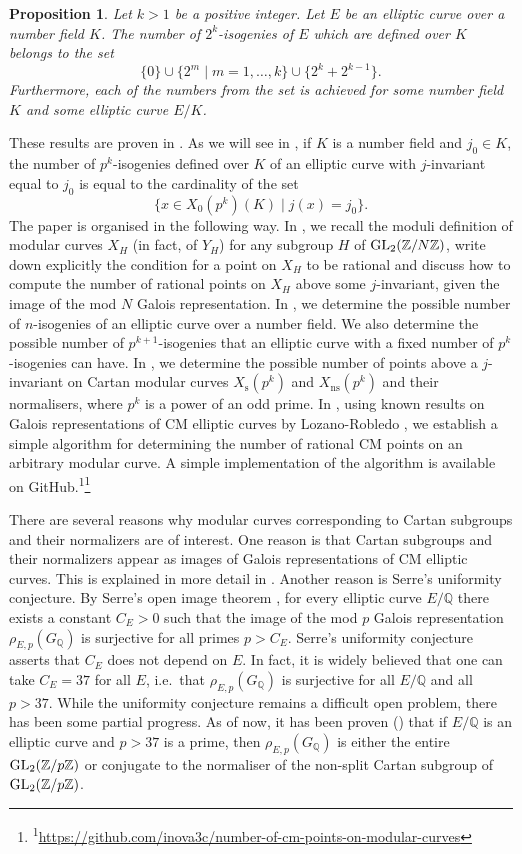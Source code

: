 \documentclass[10pt,leqno]{amsart}
\newcommand{\Z}{\mathbb{Z}}
\newcommand{\Q}{\mathbb{Q}}
\newcommand{\GL}{\textnormal{GL}}
\newtheorem{proposition}[theorem]{Proposition}
\theoremstyle{definition}
\theoremstyle{remark}
\numberwithin{theorem}{section}
\begin{document}
\begin{proposition}
     Let $k>1$ be a positive integer. Let $E$ be an elliptic curve over a number field $K$. The number of $2^k$-isogenies of $E$ which are defined over $K$ belongs to the set $$\{0\} \cup \{2^m \mid m=1,\ldots, k\}\cup \{2^k+2^{k-1}\}.$$ Furthermore, each of the numbers from the set is achieved for some number field $K$ and some elliptic curve $E/K$.  
\end{proposition}
These results are proven in . As we will see in , if $K$ is a number field and $j_0\in K$, the number of $p^k$-isogenies defined over $K$ of an elliptic curve with $j$-invariant equal to $j_0$ is equal to the cardinality of the set $$\{ x \in X_0(p^k)(K) \mid j(x)=j_0\}.$$ 
The paper is organised in the following way. In , we recall the moduli definition of modular curves $X_H$ (in fact, of $Y_H$) for any subgroup $H$ of $\GL_2(\Z/N\Z)$, write down explicitly the condition for a point on $X_H$ to be rational and discuss how to compute the number of rational points on $X_H$ above some $j$-invariant, given the image of the mod $N$ Galois representation. In , we determine the possible number of $n$-isogenies of an elliptic curve over a number field. We also determine the possible number of $p^{k+1}$-isogenies that an elliptic curve with a fixed number of $p^k$-isogenies can have. In , we determine the possible number of points above a $j$-invariant on Cartan modular curves $X_{\mathrm{s}}(p^k)$ and $X_{\mathrm{ns}}(p^k)$ and their normalisers, where $p^k$ is a power of an odd prime. In , using known results on Galois representations of CM elliptic curves by Lozano-Robledo \cite{alvarocm}, we establish a simple algorithm for determining the number of rational CM points on an arbitrary modular curve.  A simple implementation of the algorithm is available on GitHub\cite{novak:cm-modular-curves-github}.\textsuperscript{1}\footnote{\textsuperscript{1}\url{https://github.com/inova3c/number-of-cm-points-on-modular-curves}}

There are several reasons why modular curves corresponding to Cartan subgroups and their normalizers are of interest. One reason is that Cartan subgroups and their normalizers appear as images of Galois representations of CM elliptic curves. This is explained in more detail in . Another reason is Serre's uniformity conjecture. By Serre's open image theorem \cite{openimage}, for every elliptic curve $E/\Q$ there exists a constant $C_E>0$ such that the image of the mod $p$ Galois representation $\rho_{E,p}(G_\Q)$ is surjective for all primes $p>C_E$. Serre's uniformity conjecture asserts that $C_E$ does not depend on $E$.  In fact, it is widely believed that one can take $C_E=37$ for all $E$, i.e.\ that $\rho_{E,p}(G_\Q)$ is surjective for all $E/\Q$ and all $p>37$. While the uniformity conjecture remains a difficult open problem, there has been some partial progress. As of now, it has been proven (\cite{serrecheb, biluparent, bpr, fl}) that if $E/\Q$ is an elliptic curve and $p>37$ is a prime, then $\rho_{E,p}(G_\Q)$ is either the entire $\GL_2(\Z/p\Z)$ or conjugate to the normaliser of the non-split Cartan subgroup of $\GL_2(\Z/p\Z)$.  
\end{document}
